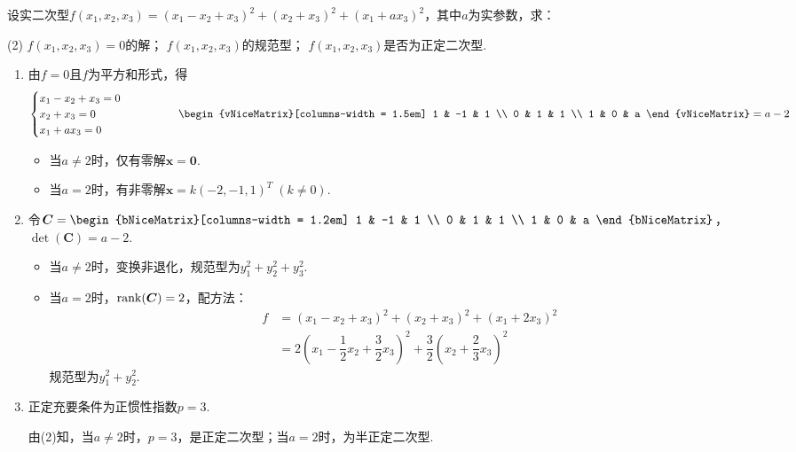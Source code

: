 \documentclass[12pt, a4paper, oneside, UTF8]{ctexbook}
\begin{document}
\begin{example}
    设实二次型$f(x_1, x_2, x_3) = (x_1-x_2+x_3)^2+(x_2+x_3)^2+(x_1+ax_3)^2$，其中$a$为实参数，求：
    \begin{tasks}[label=(\arabic*)](2)
        \task $f(x_1, x_2, x_3)=0$的解；
        \task $f(x_1, x_2, x_3)$的规范型；
        \task $f(x_1, x_2, x_3)$是否为正定二次型.
    \end{tasks}
\end{example}
\begin{solution}
    \begin{enumerate}[label = (\arabic*)]
        \item 由$f=0$且$f$为平方和形式，得
        \[ \begin{cases} x_1-x_2+x_3=0 \\ x_2+x_3=0 \\ x_1+ax_3=0 \end{cases} \qquad\qquad
        \begin{vNiceMatrix}[columns-width = 1.5em]
            1 & -1 & 1  \\
            0 & 1 & 1  \\
            1 & 0 & a 
            \end{vNiceMatrix} = a-2\]
        \begin{itemize}
            \item 当$a \neq 2$时，仅有零解$\bm{x}=\bm{0}$.
            \item 当$a = 2$时，有非零解$\bm{x} = k(-2, -1, 1)^T \; (k \neq 0)$.
        \end{itemize}
        \item 令$\bm{C} = \begin{bNiceMatrix}[columns-width = 1.2em] 1 & -1 & 1 \\ 0 & 1 & 1 \\ 1 & 0 & a \end{bNiceMatrix}$，$\det(\bm{C}) = a-2$.
        \begin{itemize}
            \item 当$a \neq 2$时，变换非退化，规范型为$y_1^2 + y_2^2 + y_3^2$.
            \item 当$a = 2$时，$\mathrm{rank}(\bm{C})=2$，配方法：
            \begin{align*}
                f &= (x_1 - x_2 + x_3)^2 + (x_2 + x_3)^2 + (x_1 + 2x_3)^2 \\
                &= 2(x_1 - \dfrac{1}{2}x_2 + \dfrac{3}{2}x_3)^2 + \dfrac{3}{2}(x_2 + \dfrac{2}{3}x_3)^2
            \end{align*}
            规范型为$y_1^2 + y_2^2$.
        \end{itemize}
        \item 正定充要条件为正惯性指数$p=3$.
        
        由(2)知，当$a \neq 2$时，$p=3$，是正定二次型；当$a=2$时，为半正定二次型.
    \end{enumerate}
\end{solution}
\end{document}
